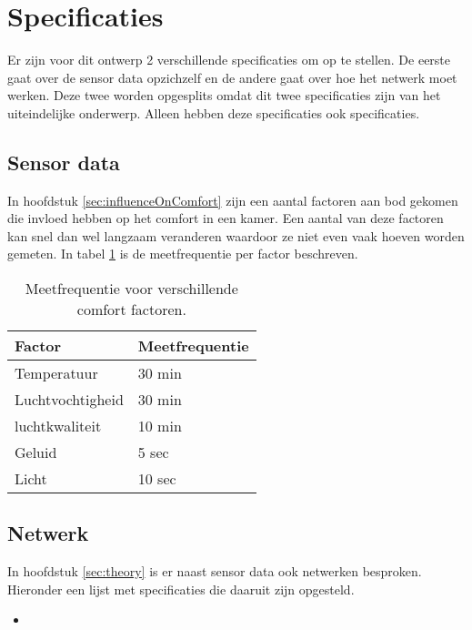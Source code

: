 \section{Specificaties}

Er zijn voor dit ontwerp 2 verschillende specificaties om op te stellen. De eerste gaat over de sensor data opzichzelf en de andere gaat over hoe 
het netwerk moet werken. Deze twee worden opgesplits omdat dit twee specificaties zijn van het uiteindelijke onderwerp. Alleen hebben deze specificaties 
ook specificaties.

\subsection{Sensor data}
In hoofdstuk \ref{sec:influenceOnComfort} zijn een aantal factoren aan bod gekomen die invloed hebben op het comfort in een kamer. Een aantal van deze factoren kan snel dan wel langzaam veranderen waardoor ze niet even vaak hoeven worden gemeten. In tabel \ref{tabel:meetfrequentie} is de meetfrequentie per factor beschreven.
\begin{table}[h]
    \centering
    \begin{tabular}{|l|l|}\hline
        Factor           & Meetfrequentie \\\hline
        Temperatuur      & 30 min         \\\hline
        Luchtvochtigheid & 30 min         \\\hline
        luchtkwaliteit   & 10 min         \\\hline
        Geluid           & 5 sec          \\\hline
        Licht            & 10 sec         \\\hline
    \end{tabular}
    \caption{Meetfrequentie voor verschillende comfort factoren.}
    \label{tabel:meetfrequentie}
\end{table}

\subsection{Netwerk}
In hoofdstuk \ref{sec:theory} is er naast sensor data ook netwerken besproken. Hieronder een lijst met specificaties die daaruit zijn 
opgesteld.
\begin{itemize}
    \item 
\end{itemize}